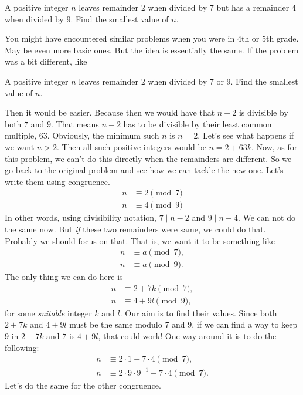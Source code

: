 \documentclass{subfile}
\begin{document}
	\begin{problem}
		A positive integer $n$ leaves remainder $2$ when divided by $7$ but has a remainder $4$ when divided by $9$. Find the smallest value of $n$.
	\end{problem}
	You might have encountered similar problems when you were in $4$th or $5$th grade. May be even more basic ones. But the idea is essentially the same. If the problem was a bit different, like
	\begin{problem}
		A positive integer $n$ leaves remainder $2$ when divided by $7$ or $9$. Find the smallest value of $n$.
	\end{problem}
	Then it would be easier. Because then we would have that $n-2$ is 
	divisible by both $7$ and $9$. That means $n-2$ has to be divisible by their least common multiple, $63$. Obviously, the minimum such $n$ is $n=2$. Let's see what happens if we want $n>2$. Then all such positive integers would be $n=2+63k$. Now, as for this problem, we can't do this directly when the remainders are different. So we go back to the original problem and see how we can tackle the new one. Let's write them using congruence.
	\begin{align*}
		n & \equiv2\pmod{7}\\
		n & \equiv4\pmod{9}
	\end{align*}
	In other words, using divisibility notation, $7\mid n-2$ and $9\mid n-4$. We can not do the same now. But \textit{if} these two remainders were same, we could do that. Probably we should focus on that. That is, we want it to be something like
		\begin{align*}
			n & \equiv a\pmod 7,\\
			n & \equiv a\pmod 9.
		\end{align*}
	The only thing we can do here is
		\begin{align*}
			n & \equiv2+7k\pmod7,\\
			n & \equiv4+9l\pmod9,
		\end{align*}
	for some \textit{suitable} integer $k$ and $l$. Our aim is to find their values. Since both $2+7k$ and $4+9l$ must be the same modulo $7$ and $9$, if we can find a way to keep $9$ in $2+7k$ and $7$ is $4+9l$, that could work! One way around it is to do the following:
		\begin{align*}
			n & \equiv2\cdot1+7\cdot4\pmod7,\\
			n & \equiv2\cdot9\cdot9^{-1}+7\cdot4\pmod{7}.
		\end{align*}
	Let's do the same for the other congruence.
\end{document}

